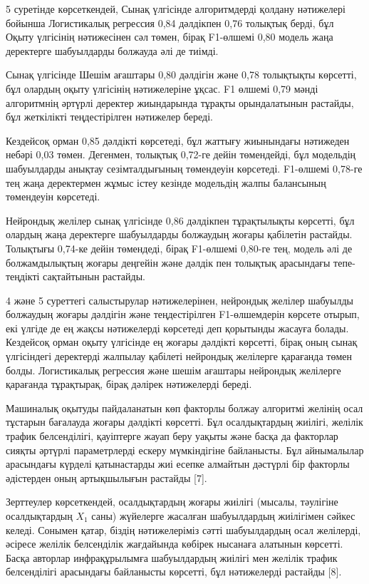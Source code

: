 \begin{multicols}{2}
5 суретінде көрсеткендей, Сынақ үлгісінде алгоритмдерді қолдану
нәтижелері бойынша Логистикалық регрессия 0,84 дәлдікпен 0,76 толықтық
берді, бұл Оқыту үлгісінің нәтижесінен сәл төмен, бірақ F1-өлшемі 0,80
модель жаңа деректерге шабуылдарды болжауда әлі де тиімді.

Сынақ үлгісінде Шешім ағаштары 0,80 дәлдігін және 0,78 толықтықты
көрсетті, бұл олардың оқыту үлгісінің нәтижелеріне ұқсас. F1 өлшемі 0,79
мәнді алгоритмнің әртүрлі деректер жиындарында тұрақты орындалатынын
растайды, бұл жеткілікті теңдестірілген нәтижелер береді.

Кездейсоқ орман 0,85 дәлдікті көрсетеді, бұл жаттығу жиынындағы
нәтижеден небәрі 0,03 төмен. Дегенмен, толықтық 0,72-ге дейін
төмендейді, бұл модельдің шабуылдарды анықтау сезімталдығының төмендеуін
көрсетеді. F1-өлшемі 0,78-ге тең жаңа деректермен жұмыс істеу кезінде
модельдің жалпы балансының төмендеуін көрсетеді.

Нейрондық желілер сынақ үлгісінде 0,86 дәлдікпен тұрақтылықты көрсетті,
бұл олардың жаңа деректерге шабуылдарды болжаудың жоғары қабілетін
растайды. Толықтығы 0,74-ке дейін төмендеді, бірақ F1-өлшемі 0,80-ге
тең, модель әлі де болжамдылықтың жоғары деңгейін және дәлдік пен
толықтық арасындағы тепе-теңдікті сақтайтынын растайды.

4 және 5 суреттегі салыстырулар нәтижелерінен, нейрондық желілер
шабуылды болжаудың жоғары дәлдігін және теңдестірілген F1-өлшемдерін
көрсете отырып, екі үлгіде де ең жақсы нәтижелерді көрсетеді деп
қорытынды жасауға болады. Кездейсоқ орман оқыту үлгісінде ең жоғары
дәлдікті көрсетті, бірақ оның сынақ үлгісіндегі деректерді жалпылау
қабілеті нейрондық желілерге қарағанда төмен болды. Логистикалық
регрессия және шешім ағаштары нейрондық желілерге қарағанда тұрақтырақ,
бірақ дәлірек нәтижелерді береді.

Машиналық оқытуды пайдаланатын көп факторлы болжау алгоритмі желінің
осал тұстарын бағалауда жоғары дәлдікті көрсетті. Бұл осалдықтардың
жиілігі, желілік трафик белсенділігі, қауіптерге жауап беру уақыты және
басқа да факторлар сияқты әртүрлі параметрлерді ескеру мүмкіндігіне
байланысты. Бұл айнымалылар арасындағы күрделі қатынастарды жиі есепке
алмайтын дәстүрлі бір факторлы әдістерден оның артықшылығын растайды
{[}7{]}.

Зерттеулер көрсеткендей, осалдықтардың жоғары жиілігі (мысалы, тәулігіне
осалдықтардың \(X_{1}\) саны) жүйелерге жасалған шабуылдардың жиілігімен
сәйкес келеді. Сонымен қатар, біздің нәтижелеріміз сәтті шабуылдардың
осал желілерді, әсіресе желілік белсенділік жағдайында көбірек нысанаға
алатынын көрсетті. Басқа авторлар инфрақұрылымға шабуылдардың жиілігі
мен желілік трафик белсенділігі арасындағы байланысты көрсетті, бұл
нәтижелерді растайды {[}8{]}.


\end{multicols}
